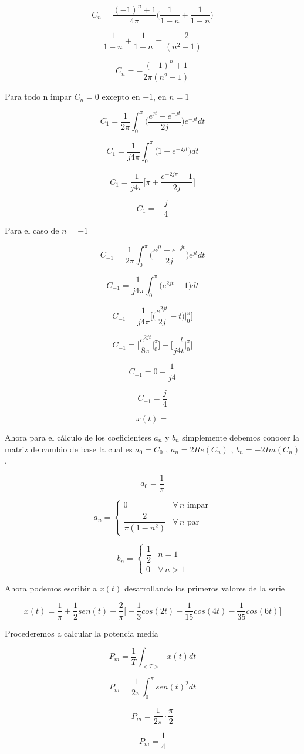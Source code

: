 $$C_n = \dfrac{(-1)^n + 1}{4\pi} \bigg(\dfrac{1}{1-n} + \dfrac{1}{1+n} \bigg) $$

$$\dfrac{1}{1-n} + \dfrac{1}{1+n} = \dfrac{-2}{(n^2-1)} $$

$$C_n = -\dfrac{(-1)^n + 1}{2\pi(n^2-1)} $$

Para todo n impar $C_n = 0$ excepto en $\pm 1$, en $n=1$

$$C_1 = \dfrac{1}{2\pi} \int_{0}^{\pi} \bigg(\dfrac{e^{jt} - e^{-jt}}{2j} \bigg) e^{-jt} dt $$

$$C_1 = \dfrac{1}{j4\pi} \int_{0}^{\pi} \bigg(1- e^{-2jt} \bigg) dt $$

$$C_1 = \dfrac{1}{j4\pi} \bigg[\pi + \dfrac{e^{-2j\pi} - 1}{2j} \bigg] $$

$$C_1 = -\dfrac{j}{4} $$

Para el caso de $n=-1$

$$C_{-1} = \dfrac{1}{2\pi} \int_{0}^{\pi} \bigg(\dfrac{e^{jt} - e^{-jt}}{2j} \bigg) e^{jt} dt $$

$$C_{-1} = \dfrac{1}{j4\pi} \int_{0}^{\pi} \bigg(e^{2jt} - 1 \bigg) dt$$

$$C_{-1} = \dfrac{1}{j4\pi} \bigg[\bigg(\dfrac{e^{2jt}}{2j} - t \bigg)\bigg\rvert_{0}^{\pi} \bigg]$$

$$C_{-1} = \bigg[\dfrac{e^{2jt}}{8\pi}\bigg\rvert_{0}^{\pi} \bigg] - \bigg[\dfrac{-t}{j4t}\bigg\rvert_{0}^{\pi} \bigg] $$

$$C_{-1} = 0 - \dfrac{1}{j4} $$

$$C_{-1} = \dfrac{j}{4} $$

$$x(t) = $$

Ahora para el c\'alculo de los coeficientess $a_n$ y $b_n$ simplemente debemos conocer la matriz de
cambio de base la cual es $a_0 = C_0$ , $a_n = 2Re(C_n)$ , $b_n = -2Im(C_n)$.

\[
a_0 = \frac{1}{\pi}
\]

\[
a_n =
\begin{cases}
0 & \forall \, n \text{ impar} \\
\dfrac{2}{\pi(1-n^2)} & \forall \, n \text{ par}
\end{cases}
\]

\[
b_n =
\begin{cases}
\dfrac{1}{2} & n = 1 \\
0 & \forall \, n > 1
\end{cases}
\]

Ahora podemos escribir a $x(t)$ desarrollando los primeros valores de la serie

$$x(t) = \dfrac{1}{\pi} + \dfrac{1}{2}sen(t) + \dfrac{2}{\pi} \bigg[-\dfrac{1}{3} cos(2t) - \dfrac{1}{15} cos(4t) - \dfrac{1}{35} cos(6t)\bigg] $$

Procederemos a calcular la potencia media

$$P_m = \dfrac{1}{T} \int_{<T>} x(t) dt $$

$$P_m = \dfrac{1}{2\pi} \int_{0}^{\pi} sen(t)^2 dt $$

$$P_m = \dfrac{1}{2\pi} \cdot \dfrac{\pi}{2} $$

$$P_m = \dfrac{1}{4}$$
